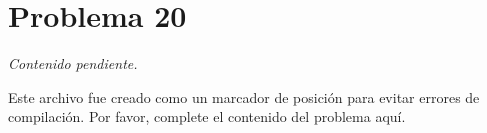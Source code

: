 \section*{Problema 20}
\textit{Contenido pendiente.}

Este archivo fue creado como un marcador de posición para evitar errores de compilación. Por favor, complete el contenido del problema aquí.